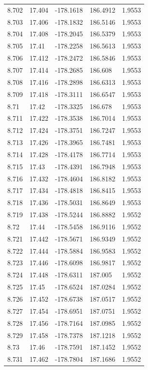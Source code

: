 \begin{tabular}{lllll}
8.702 & 17.404 & -178.1618 & 186.4912 & 1.9553 \\
8.703 & 17.406 & -178.1832 & 186.5146 & 1.9553 \\
8.704 & 17.408 & -178.2045 & 186.5379 & 1.9553 \\
8.705 & 17.41 & -178.2258 & 186.5613 & 1.9553 \\
8.706 & 17.412 & -178.2472 & 186.5846 & 1.9553 \\
8.707 & 17.414 & -178.2685 & 186.608 & 1.9553 \\
8.708 & 17.416 & -178.2898 & 186.6313 & 1.9553 \\
8.709 & 17.418 & -178.3111 & 186.6547 & 1.9553 \\
8.71 & 17.42 & -178.3325 & 186.678 & 1.9553 \\
8.711 & 17.422 & -178.3538 & 186.7014 & 1.9553 \\
8.712 & 17.424 & -178.3751 & 186.7247 & 1.9553 \\
8.713 & 17.426 & -178.3965 & 186.7481 & 1.9553 \\
8.714 & 17.428 & -178.4178 & 186.7714 & 1.9553 \\
8.715 & 17.43 & -178.4391 & 186.7948 & 1.9553 \\
8.716 & 17.432 & -178.4604 & 186.8182 & 1.9553 \\
8.717 & 17.434 & -178.4818 & 186.8415 & 1.9553 \\
8.718 & 17.436 & -178.5031 & 186.8649 & 1.9553 \\
8.719 & 17.438 & -178.5244 & 186.8882 & 1.9552 \\
8.72 & 17.44 & -178.5458 & 186.9116 & 1.9552 \\
8.721 & 17.442 & -178.5671 & 186.9349 & 1.9552 \\
8.722 & 17.444 & -178.5884 & 186.9583 & 1.9552 \\
8.723 & 17.446 & -178.6098 & 186.9817 & 1.9552 \\
8.724 & 17.448 & -178.6311 & 187.005 & 1.9552 \\
8.725 & 17.45 & -178.6524 & 187.0284 & 1.9552 \\
8.726 & 17.452 & -178.6738 & 187.0517 & 1.9552 \\
8.727 & 17.454 & -178.6951 & 187.0751 & 1.9552 \\
8.728 & 17.456 & -178.7164 & 187.0985 & 1.9552 \\
8.729 & 17.458 & -178.7378 & 187.1218 & 1.9552 \\
8.73 & 17.46 & -178.7591 & 187.1452 & 1.9552 \\
8.731 & 17.462 & -178.7804 & 187.1686 & 1.9552 \\

\end{tabular}
